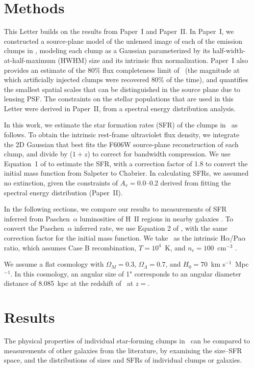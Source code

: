\section{Methods}\label{sec:methods}
This Letter builds on the results from Paper~I and Paper~II.
In Paper~I, we constructed a source-plane model of the unlensed image
of each of the emission clumps in \arcname, 
modeling each clump as a Gaussian 
parameterized by its half-width-at-half-maximum (HWHM) size 
and its intrinsic flux normalization.
Paper~I also provides an estimate of the  
$80\%$ flux completeness limit of 
\fluxcompleteness\ (the magnitude at which artificially injected clumps were recovered 
$80\%$ of the time), and quantifies the 
smallest spatial scales that can be distinguished in the source plane
due to lensing PSF.
The constraints on the stellar populations that are used in this
Letter were derived in Paper~II,
from a spectral energy distribution analysis. 

In this work, we estimate the star formation rates (SFR) of the clumps in
\arcname\ as follows.  
To obtain the intrinsic rest-frame ultraviolet flux density, we integrate 
the 2D Gaussian that best fits the F606W source-plane reconstruction of each clump, 
and divide by ($1+z$) to correct for bandwidth compression.  
We use Equation~1 of \citet{Kennicutt:1998ee}
to estimate the SFR, 
with a correction factor of 1.8 to convert the initial mass function from Salpeter to Chabrier.
In calculating SFRs, we assumed no extinction, 
given the constraints of $A_v = 0.0$--0.2 derived from fitting the spectral 
energy distribution (Paper~II).

In the following sections, we compare our results to
measurements of SFR inferred from Paschen~$\alpha$ luminosities
of H~II regions in nearby galaxies \citep{Liu:2013qy}.
To convert the Paschen~$\alpha$ inferred rate, we use Equation 2 of
\citet{Kennicutt:1998ee}, with the same correction factor for the initial mass function.
We take \HaParatio\ as the intrinsic H$\alpha$/Pa$\alpha$ ratio, 
which assumes Case B recombination, $T=10^4$~K, and $n_e =100$~cm$^{-3}$ .

We assume a flat cosmology with $\Omega_M = 0.3$, $\Omega_{\Lambda} = 0.7$, 
and $H_0 = 70$~km s$^{-1}$~Mpc$^{-1}$.
In this cosmology, an angular size of 1" 
corresponds to an angular diameter distance of 8.085~kpc at the 
redshift of \arcname\ at $z=$\zA . 

\section{Results}\label{sec:results}
The physical properties of individual star-forming clumps in
\arcname\ can be compared to measurements of other galaxies from the
literature, by examining the size--SFR space, and the
distributions of sizes and SFRs of individual clumps or galaxies. 

